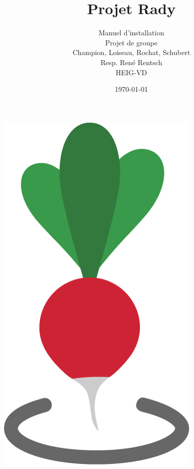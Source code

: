 \documentclass[french]{article}
\begin{document}
	
	
	\title{Projet Rady} %
	\author{Manuel d'installation\\ 
		Projet de groupe\\
		Champion, Loiseau, Rochat, Schubert\\
		Resp. René Rentsch\\
		HEIG-VD}
	\date{\today} %
	\maketitle
	\vspace{2cm}
	\centering
	\includegraphics[scale=0.3]{../logo/icone}
	\thispagestyle{empty}
	
	\newpage
	\thispagestyle{empty}
	$ $
	\newpage
	
	\justify
	\normalsize
	
	\tableofcontents
	
\end{document}
